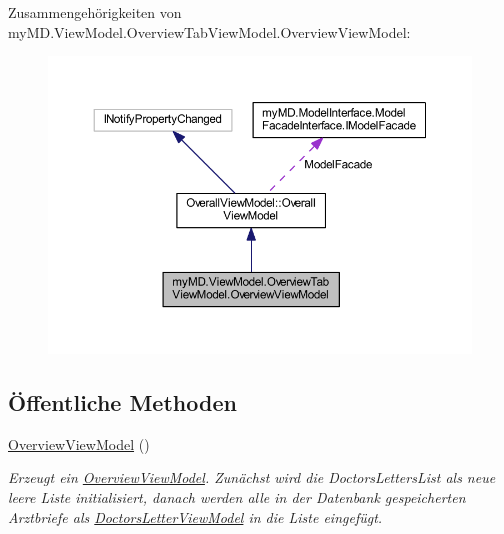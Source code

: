 Zusammengehörigkeiten von my\+M\+D.\+View\+Model.\+Overview\+Tab\+View\+Model.\+Overview\+View\+Model\+:\nopagebreak
\begin{figure}[H]
\begin{center}
\leavevmode
\includegraphics[width=350pt]{classmy_m_d_1_1_view_model_1_1_overview_tab_view_model_1_1_overview_view_model__coll__graph}
\end{center}
\end{figure}
\subsection*{Öffentliche Methoden}
\begin{DoxyCompactItemize}
\item 
\mbox{\hyperlink{classmy_m_d_1_1_view_model_1_1_overview_tab_view_model_1_1_overview_view_model_a8099d87e6d22edcd5119a845cd16d96b}{Overview\+View\+Model}} ()
\begin{DoxyCompactList}\small\item\em Erzeugt ein \mbox{\hyperlink{classmy_m_d_1_1_view_model_1_1_overview_tab_view_model_1_1_overview_view_model}{Overview\+View\+Model}}. Zunächst wird die Doctors\+Letters\+List als neue leere Liste initialisiert, danach werden alle in der Datenbank gespeicherten Arztbriefe als \mbox{\hyperlink{classmy_m_d_1_1_view_model_1_1_overview_tab_view_model_1_1_doctors_letter_view_model}{Doctors\+Letter\+View\+Model}} in die Liste eingefügt. \end{DoxyCompactList}\end{DoxyCompactItemize}
